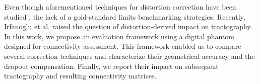 Even though aforementioned techniques for distortion correction
have been studied \cite{zeng_image_2002,wu_comparison_2008},
the lack of a gold-standard limits benchmarking 
strategies. Recently, Irfanoglu et al.
\cite{irfanoglu_effects_2012} raised the question
of distortion-derived impact on tractography.
In this work, we propose an evaluation framework
using a digital phantom designed for connectivity assessment.
This framework enabled us to compare several correction 
techniques and characterize their geometrical accuracy 
and the dropout compensation. Finally, we report their 
impact on subsequent tractography and resulting connectivity
matrices.